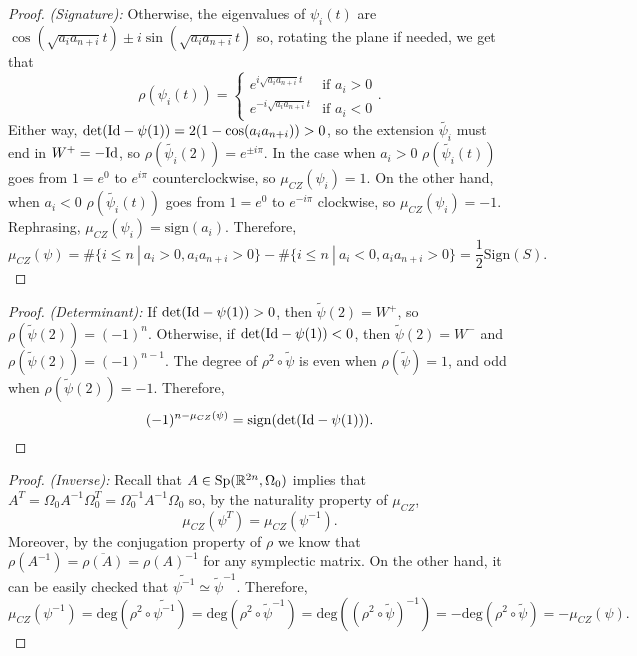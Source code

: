 \begin{proof} {\it (Signature):}
Otherwise, the eigenvalues of $\psi_i(t)$ are $\cos(\sqrt{a_ia_{n+i}}t) \pm i \sin(\sqrt{a_ia_{n+i}}t)$ so, rotating the plane if needed, we get that
\[ \rho(\psi_i(t)) = \left\{ \begin{array}{lc} e^{i \sqrt{a_ia_{n+i}} t} & \text{if } a_i > 0 \\ e^{- i \sqrt{a_ia_{n+i}} t} & \text{if } a_i < 0 \end{array} \right. .\]
Either way, $\det(\mathrm{Id} - \psi(1)) = 2(1-\cos(a_ia_{n+i})) > 0$, so the extension $\widetilde{\psi_i}$ must end in $W^+ = - \mathrm{Id}$, so $\rho(\widetilde{\psi_i}(2)) = e^{\pm i \pi}$. In the case when $a_i > 0$ $\rho(\widetilde{\psi_i}(t))$ goes from $1=e^0$ to $e^{i\pi}$ counterclockwise, so $\mu_{CZ}(\psi_i) = 1$. On the other hand, when $a_i < 0$ $\rho(\widetilde{\psi_i}(t))$ goes from $1=e^0$ to $e^{-i\pi}$ clockwise, so $\mu_{CZ}(\psi_i) = -1$. Rephrasing, $\mu_{CZ}(\psi_i) = \mathrm{sign}(a_i)$. Therefore,
\[\mu_{CZ}(\psi) = \# \{ i \leq n \ | \ a_i > 0, a_ia_{n+i} > 0 \} - \# \{ i \leq n \ | \ a_i < 0, a_ia_{n+i} > 0 \} = \frac12 \mathrm{Sign}(S) .\]
\end{proof}

\begin{proof} {\it (Determinant):} If $\det(\mathrm{Id} - \psi(1)) > 0$, then $\widetilde{\psi}(2) = W^+$, so $\rho(\widetilde{\psi}(2)) = (-1)^n$. Otherwise, if $\det(\mathrm{Id} - \psi(1)) < 0$, then $\widetilde{\psi}(2) = W^-$ and $\rho(\widetilde{\psi}(2)) = (-1)^{n-1}$. The degree of $\rho^2 \circ \widetilde{\psi}$ is even when $\rho(\widetilde{\psi}) = 1$, and odd when $\rho(\widetilde{\psi}(2)) = -1$. Therefore,
\[(-1)^{n-\mu_{CZ}(\psi)} = \mathrm{sign} ( \det(\mathrm{Id} - \psi(1))) .\]
\end{proof}

\begin{proof} {\it (Inverse):} Recall that $A \in \mathrm{Sp}(\mathbb{R}^{2n},\Omega_0)$ implies that $A^T = \Omega_0 A^{-1} \Omega_0^T = \Omega_0^{-1} A^{-1} \Omega_0$ so, by the naturality property of $\mu_{CZ}$,
\[\mu_{CZ}(\psi^T) = \mu_{CZ}(\psi^{-1}) .\]
Moreover, by the conjugation property of $\rho$ we know that $\rho(A^{-1}) = \overline{\rho(A)} = \rho(A)^{-1}$ for any symplectic matrix. On the other hand, it can be easily checked that $\widetilde{\psi^{-1}} \simeq \widetilde{\psi}^{-1}$. Therefore,
\[\mu_{CZ}(\psi^{-1}) = \text{deg}(\rho^2 \circ \widetilde{\psi^{-1}}) = \text{deg}(\rho^2 \circ \widetilde{\psi}^{-1}) = \text{deg}((\rho^2 \circ \widetilde{\psi})^{-1}) = - \text{deg}(\rho^2 \circ \widetilde{\psi}) = - \mu_{CZ}(\psi) .\]
\end{proof}

